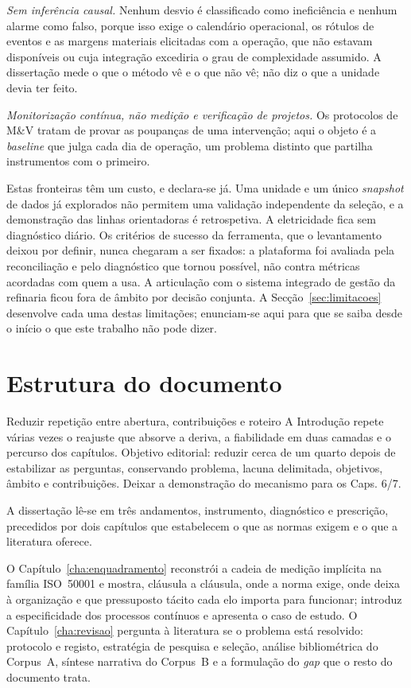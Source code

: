 \emph{Sem inferência causal.} Nenhum desvio é classificado como
ineficiência e nenhum alarme como falso, porque isso exige o calendário
operacional, os rótulos de eventos e as margens materiais elicitadas
com a operação, que não estavam disponíveis ou cuja integração excediria o grau de complexidade assumido. A dissertação mede o que o
método vê e o que não vê; não diz o que a unidade devia ter feito.

\emph{Monitorização contínua, não medição e verificação de projetos.}
Os protocolos de M\&V tratam de provar as poupanças de uma intervenção;
aqui o objeto é a \emph{baseline} que julga cada dia de operação, um
problema distinto que partilha instrumentos com o primeiro.

Estas fronteiras têm um custo, e declara-se já. Uma unidade e um único
\emph{snapshot} de dados já explorados não permitem uma validação
independente da seleção, e a demonstração das linhas orientadoras é
retrospetiva. A
eletricidade fica sem diagnóstico diário. Os
critérios de sucesso da ferramenta, que o levantamento deixou por
definir, nunca chegaram a ser fixados: a plataforma foi avaliada pela
reconciliação e pelo diagnóstico que tornou possível, não contra
métricas acordadas com quem a usa. A articulação com o sistema integrado
de gestão da refinaria ficou fora de âmbito por decisão conjunta. A
Secção~\ref{sec:limitacoes} desenvolve cada uma destas limitações;
enunciam-se aqui para que se saiba desde o início o que este trabalho
não pode dizer.

\section{Estrutura do documento}
\label{sec:estrutura}
{Reduzir repetição entre abertura, contribuições e roteiro}
{A Introdução repete várias vezes o reajuste que absorve a deriva, a
fiabilidade em duas camadas e o percurso dos capítulos. Objetivo editorial:
reduzir cerca de um quarto depois de estabilizar as perguntas, conservando
problema, lacuna delimitada, objetivos, âmbito e contribuições.
Deixar a demonstração do mecanismo para os Caps. 6/7.}%

A dissertação lê-se em três andamentos, instrumento, diagnóstico e
prescrição, precedidos por dois capítulos que estabelecem o que as
normas exigem e o que a literatura oferece.

O Capítulo~\ref{cha:enquadramento} reconstrói a cadeia de medição
implícita na família ISO~50001 e mostra, cláusula a cláusula, onde a
norma exige, onde deixa à organização e que pressuposto tácito cada elo
importa para funcionar; introduz a especificidade dos processos
contínuos e apresenta o caso de estudo. O Capítulo~\ref{cha:revisao}
pergunta à literatura se o problema está resolvido: protocolo e
registo, estratégia de pesquisa e seleção, análise bibliométrica do
Corpus~A, síntese narrativa do Corpus~B e a formulação do \emph{gap}
que o resto do documento trata.


